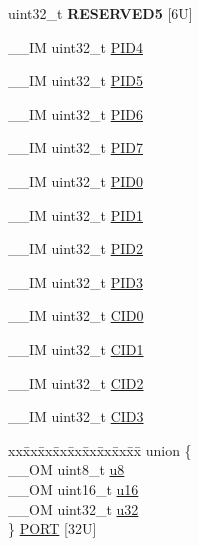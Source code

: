 \begin{DoxyCompactItemize}
\item 
\mbox{\label{struct_i_t_m___type_a4355af3f12b210d606cb9169c73be71a}} 
uint32\+\_\+t {\bfseries R\+E\+S\+E\+R\+V\+E\+D5} \mbox{[}6\+U\mbox{]}
\item 
\+\_\+\+\_\+\+IM uint32\+\_\+t \mbox{\hyperlink{struct_i_t_m___type_a4c002e97cda2375d7421ad6415b6a02f}{P\+I\+D4}}
\item 
\+\_\+\+\_\+\+IM uint32\+\_\+t \mbox{\hyperlink{struct_i_t_m___type_ac085b26f43fefeef9a4cf5c2af5e4a38}{P\+I\+D5}}
\item 
\+\_\+\+\_\+\+IM uint32\+\_\+t \mbox{\hyperlink{struct_i_t_m___type_a83ac5d00dee24cc7f805b5c147625593}{P\+I\+D6}}
\item 
\+\_\+\+\_\+\+IM uint32\+\_\+t \mbox{\hyperlink{struct_i_t_m___type_af8aa73aeaf37bdf7dfd9f6c437ff2d2f}{P\+I\+D7}}
\item 
\+\_\+\+\_\+\+IM uint32\+\_\+t \mbox{\hyperlink{struct_i_t_m___type_a6e3343cc3c4a8a5a6f14937882e9202a}{P\+I\+D0}}
\item 
\+\_\+\+\_\+\+IM uint32\+\_\+t \mbox{\hyperlink{struct_i_t_m___type_afa06959344f4991b00e6c545dd2fa30b}{P\+I\+D1}}
\item 
\+\_\+\+\_\+\+IM uint32\+\_\+t \mbox{\hyperlink{struct_i_t_m___type_a63db39f871596d28e69c283288ea2eba}{P\+I\+D2}}
\item 
\+\_\+\+\_\+\+IM uint32\+\_\+t \mbox{\hyperlink{struct_i_t_m___type_ac2d006eed52ba550a309e5f61ed9c401}{P\+I\+D3}}
\item 
\+\_\+\+\_\+\+IM uint32\+\_\+t \mbox{\hyperlink{struct_i_t_m___type_a26bbad5d9e0f1d302611d52373aef839}{C\+I\+D0}}
\item 
\+\_\+\+\_\+\+IM uint32\+\_\+t \mbox{\hyperlink{struct_i_t_m___type_a4e60a608afd6433ecd943d95e417b80b}{C\+I\+D1}}
\item 
\+\_\+\+\_\+\+IM uint32\+\_\+t \mbox{\hyperlink{struct_i_t_m___type_ad98950702e55d1851e91b22de07b11aa}{C\+I\+D2}}
\item 
\+\_\+\+\_\+\+IM uint32\+\_\+t \mbox{\hyperlink{struct_i_t_m___type_ab9af64f413bf6f67e2a8044481292f67}{C\+I\+D3}}
\item 
\begin{tabbing}
xx\=xx\=xx\=xx\=xx\=xx\=xx\=xx\=xx\=\kill
union \{\\
\>\_\_OM uint8\_t \mbox{\hyperlink{struct_i_t_m___type_a4c0550e859d614c607bd4b575f05425c}{u8}}\\
\>\_\_OM uint16\_t \mbox{\hyperlink{struct_i_t_m___type_ae93660eefe2482a8564fae9a1ca39739}{u16}}\\
\>\_\_OM uint32\_t \mbox{\hyperlink{struct_i_t_m___type_ae89dd50f788f12863c681fba1a5b60d1}{u32}}\\
\} \mbox{\hyperlink{struct_i_t_m___type_aff9add4806ce61d03f079a7f5e07ccf6}{PORT}} \mbox{[}32U\mbox{]}\\


\end{tabbing}
\end{DoxyCompactItemize}
